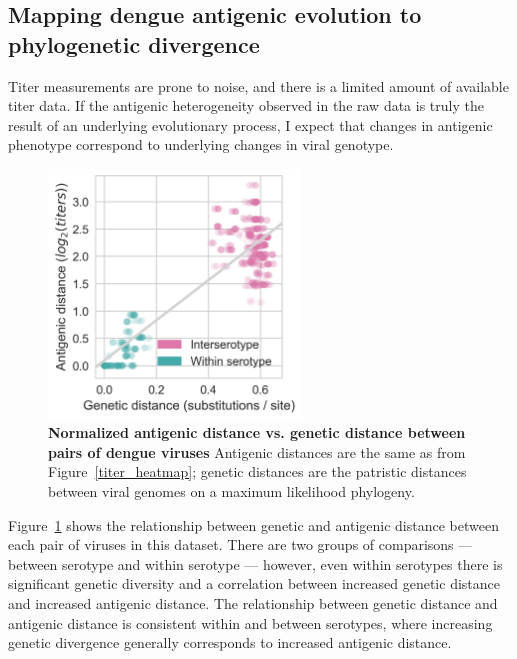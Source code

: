 \subsection{Mapping dengue antigenic evolution to phylogenetic divergence}
Titer measurements are prone to noise, and there is a limited amount of available titer data.
If the antigenic heterogeneity observed in the raw data is truly the result of an underlying evolutionary process, I expect that changes in antigenic phenotype correspond to underlying changes in viral genotype.
\begin{figure}[ht!]
  \begin{centering}
  \includegraphics[width=0.6\textwidth]{./png/genetic_antigenic_distance.png}
  	\caption[Antigenic vs. genetic distance between pairs of dengue viruses]{\textbf{Normalized antigenic distance vs. genetic distance between pairs of dengue viruses }
    Antigenic distances are the same as from Figure~\ref{titer_heatmap};
    genetic distances are the patristic distances between viral genomes on a maximum likelihood phylogeny.
    }
  	\label{genetic_antigenic_distance}
  \end{centering}
\end{figure}

Figure~\ref{genetic_antigenic_distance} shows the relationship between genetic and antigenic distance between each pair of viruses in this dataset.
There are two groups of comparisons --- between serotype and within serotype --- however, even within serotypes there is significant genetic diversity and a correlation between increased genetic distance and increased antigenic distance.
The relationship between genetic distance and antigenic distance is consistent within and between serotypes, where increasing genetic divergence generally corresponds to increased antigenic distance.

